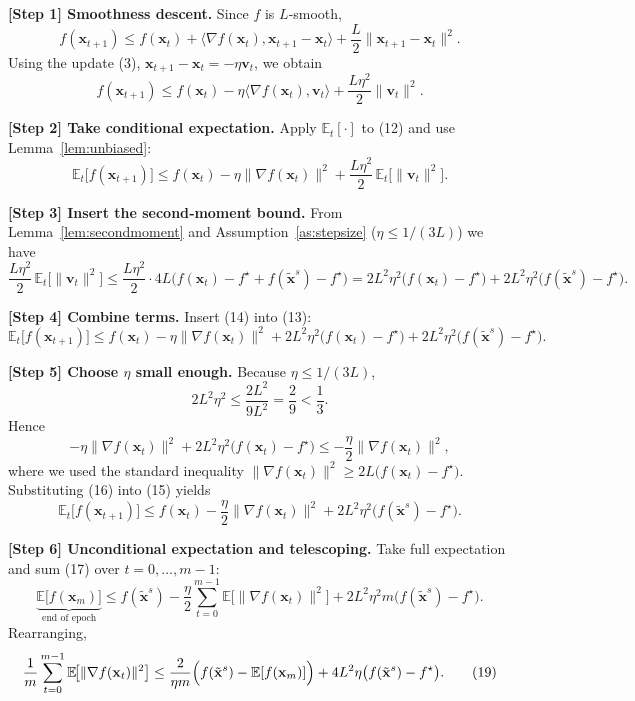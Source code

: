 \documentclass{article}
\begin{document}
\noindent\textbf{[Step 1] Smoothness descent.}  
Since $f$ is $L$‑smooth,
\[
f(\mathbf{x}_{t+1})\le f(\mathbf{x}_t)+\langle\nabla f(\mathbf{x}_t),\mathbf{x}_{t+1}-\mathbf{x}_t\rangle
+\frac{L}{2}\|\mathbf{x}_{t+1}-\mathbf{x}_t\|^{2}.
\tag{11}
\]
Using the update (3), $\mathbf{x}_{t+1}-\mathbf{x}_t=-\eta\mathbf{v}_t$, we obtain
\[
f(\mathbf{x}_{t+1})\le f(\mathbf{x}_t)-\eta\langle\nabla f(\mathbf{x}_t),\mathbf{v}_t\rangle
+\frac{L\eta^{2}}{2}\|\mathbf{v}_t\|^{2}.
\tag{12}
\]

\noindent\textbf{[Step 2] Take conditional expectation.}  
Apply $\mathbb{E}_t[\cdot]$ to (12) and use Lemma~\ref{lem:unbiased}:
\[
\mathbb{E}_t\bigl[f(\mathbf{x}_{t+1})\bigr]
\le f(\mathbf{x}_t)-\eta\|\nabla f(\mathbf{x}_t)\|^{2}
+\frac{L\eta^{2}}{2}\,\mathbb{E}_t\!\bigl[\|\mathbf{v}_t\|^{2}\bigr].
\tag{13}
\]

\noindent\textbf{[Step 3] Insert the second‑moment bound.}  
From Lemma~\ref{lem:secondmoment} and Assumption~\ref{as:stepsize} ($\eta\le 1/(3L)$) we have
\[
\frac{L\eta^{2}}{2}\,\mathbb{E}_t\!\bigl[\|\mathbf{v}_t\|^{2}\bigr]
\le \frac{L\eta^{2}}{2}\cdot 4L\bigl(f(\mathbf{x}_t)-f^\star+f(\tilde{\mathbf{x}}^{s})-f^\star\bigr)
=2L^{2}\eta^{2}\bigl(f(\mathbf{x}_t)-f^\star\bigr)
+2L^{2}\eta^{2}\bigl(f(\tilde{\mathbf{x}}^{s})-f^\star\bigr).
\tag{14}
\]

\noindent\textbf{[Step 4] Combine terms.}  
Insert (14) into (13):
\[
\mathbb{E}_t\bigl[f(\mathbf{x}_{t+1})\bigr]
\le f(\mathbf{x}_t)-\eta\|\nabla f(\mathbf{x}_t)\|^{2}
+2L^{2}\eta^{2}\bigl(f(\mathbf{x}_t)-f^\star\bigr)
+2L^{2}\eta^{2}\bigl(f(\tilde{\mathbf{x}}^{s})-f^\star\bigr).
\tag{15}
\]

\noindent\textbf{[Step 5] Choose $\eta$ small enough.}  
Because $\eta\le 1/(3L)$,
\[
2L^{2}\eta^{2}\le \frac{2L^{2}}{9L^{2}} = \frac{2}{9} < \frac{1}{3}.
\]
Hence
\[
-\eta\|\nabla f(\mathbf{x}_t)\|^{2}+2L^{2}\eta^{2}\bigl(f(\mathbf{x}_t)-f^\star\bigr)
\le -\frac{\eta}{2}\|\nabla f(\mathbf{x}_t)\|^{2},
\tag{16}
\]
where we used the standard inequality $\|\nabla f(\mathbf{x}_t)\|^{2}\ge 2L\bigl(f(\mathbf{x}_t)-f^\star\bigr)$.  Substituting (16) into (15) yields
\[
\mathbb{E}_t\bigl[f(\mathbf{x}_{t+1})\bigr]
\le f(\mathbf{x}_t)-\frac{\eta}{2}\|\nabla f(\mathbf{x}_t)\|^{2}
+2L^{2}\eta^{2}\bigl(f(\tilde{\mathbf{x}}^{s})-f^\star\bigr).
\tag{17}
\]

\noindent\textbf{[Step 6] Unconditional expectation and telescoping.}  
Take full expectation and sum (17) over $t=0,\dots ,m-1$:
\[
\underbrace{\mathbb{E}\!\bigl[f(\mathbf{x}_{m})\bigr]}_{\text{end of epoch}}
\le f(\tilde{\mathbf{x}}^{s})-\frac{\eta}{2}\sum_{t=0}^{m-1}
\mathbb{E}\!\bigl[\|\nabla f(\mathbf{x}_t)\|^{2}\bigr]
+2L^{2}\eta^{2}m\bigl(f(\tilde{\mathbf{x}}^{s})-f^\star\bigr).
\tag{18}
\]
Rearranging,
\[
\frac{1}{m}\sum_{t=0}^{m-1}
\mathbb{E}\!\bigl[\|\nabla f(\mathbf{x}_t)\|^{2}\bigr]
\le
\frac{2}{\eta m}\Bigl(f(\tilde{\mathbf{x}}^{s})- \mathbb{E}[f(\mathbf{x}_{m})]\Bigr)
+4L^{2}\eta\bigl(f(\tilde{\mathbf{x}}^{s})-f^\star\bigr).
\tag{19}
\]
\end{document}
